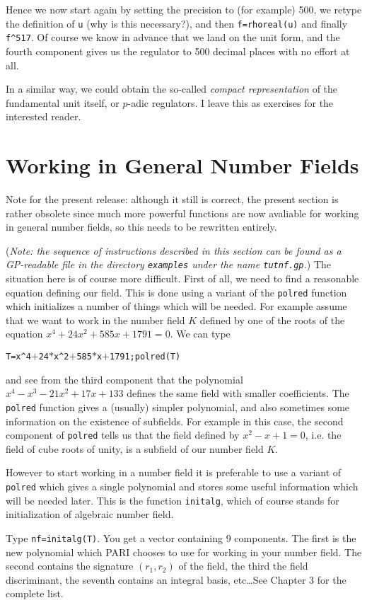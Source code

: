 Hence we now start again by setting the precision to (for example) 500,
we retype the definition of {\tt u} (why is this necessary?), and then
{\tt f=rhoreal(u)} and finally {\tt f\^{}517}. Of course we know in advance
that we land on the unit form, and the fourth component gives us the regulator
to 500 decimal places with no effort at all.

In a similar way, we could obtain the so-called {\it compact representation}
of the fundamental unit itself, or $p$-adic regulators. I leave this as
exercises for the interested reader.
\medskip
\section{Working in General Number Fields}
\medskip
Note for the present release: although it still is correct, the present section
is rather obsolete since much more powerful functions are now avaliable for
working in general number fields, so this needs to be rewritten entirely.

({\sl Note: the sequence of instructions described in this section can be found
as a GP-readable file in the directory {\tt examples} under the name
{\tt tutnf.gp}.})
\smallskip
The situation here is of course more difficult. First of all, we need to find a
reasonable equation defining our field. This is done using a variant of the
{\tt polred} function which initializes a number of things which will be
needed. For example assume that we want to work in the number field $K$ defined
by one of the roots of the equation $x^4+24x^2+585x+1791=0$. We can type

\centerline{\tt T=x\^{}4$+$24$*$x\^{}2$+$585$*$x$+$1791;polred(T)}

and see from 
the third component that the polynomial $x^4-x^3-21x^2+17x+133$ defines the
same field with smaller coefficients. The {\tt polred} function gives a 
(usually) simpler polynomial, and also sometimes some information on 
the existence of subfields. For example in this case, the second component of
{\tt polred} tells us that the field defined by $x^2-x+1=0$, i.e. the field
of cube roots of unity, is a subfield of our number field $K$. 

However to start working in a number field it is preferable to use a variant of
{\tt polred} which gives a single polynomial and stores some useful
information which will be needed later. This is the function {\tt initalg},
which of course stands for initialization of algebraic number field.

Type {\tt nf=initalg(T)}. You get a vector containing 9 components.
The first is the new polynomial which PARI chooses
to use for working in your number field. The second contains the signature
$(r_1,r_2)$ of the field, the third the field discriminant, the seventh
contains an integral basis, etc\dots See Chapter 3 for the complete list.

